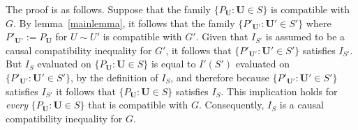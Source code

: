 The proof is as follows.  Suppose that the family $\{ P_{\bm{U}} : \bm{U} \in S\}$ is compatible with $G$.  By lemma~\ref{mainlemma}, it follows that the family $ \{ P'_{\bm{U}'} : \bm{U}' \in S'\}$ where $P'_{\bm{U}'}:= P_{\bm{U}}$ for $U \sim U'$  is compatible with $G'$.  Given that $I_{S'}$ is assumed to be a causal compatibility inequality for $G'$, it follows that $\{ P'_{\bm{U}'} : \bm{U}' \in S'\}$ satisfies $I_{S'}$.  But $I_{S}$ evaluated on $\{ P_{\bm{U}} : \bm{U} \in S\}$ is equal to $I'(S')$ evaluated on $\{ P'_{\bm{U}'} : \bm{U}' \in S'\}$, by the definition of $I_{S}$, and therefore because $\{ P'_{\bm{U}'} : \bm{U}' \in S'\}$ satisfies $I_{S'}$ it follows that $\{ P_{\bm{U}} : \bm{U} \in S\}$ satisfies $I_{S}$.  This implication holds for {\em every} $\{ P_{\bm{U}} : \bm{U} \in S\}$ that is compatible with $G$.  Consequently, $I_{S}$ is a causal compatibility inequality for $G$.  






